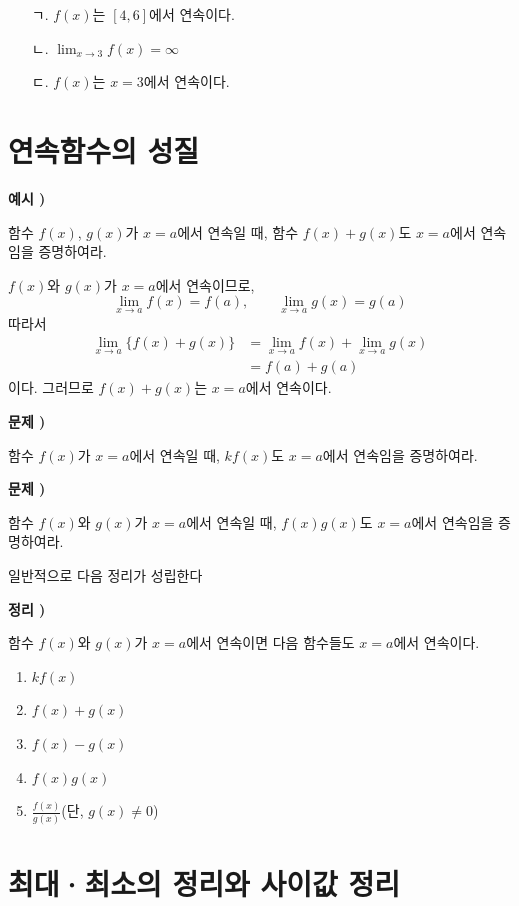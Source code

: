 \documentclass{oblivoir}
\newcounter{num}
\newcommand\theo[1]
{\bigskip\par\noindent\stepcounter{num} \textbf{정리 \thenum) #1}\par\noindent}
\newcommand\exam[1]
{\bigskip\par\noindent\stepcounter{num} \textbf{예시 \thenum) #1}\par\noindent}
\newcommand\prob[1]
{\bigskip\par\noindent\stepcounter{num} \textbf{문제 \thenum) #1}\par\noindent}
\newcommand\procedure[1]{\begin{mdframed}\vspace{#1\textheight}\end{mdframed}\bigskip}
\let\oldsection\section
\renewcommand\section{\clearpage\oldsection}
\begin{document}
\begin{enumerate}
\item[ㄱ.]
\(f(x)\)는 \([4,6]\)에서 연속이다.
\item[ㄴ.]
\(\displaystyle\lim_{x\to3}f(x)=\infty\)
\item[ㄷ.]
\(f(x)\)는 \(x=3\)에서 연속이다.
\end{enumerate}

\section{연속함수의 성질}

%
\exam{}
함수 \(f(x)\), \(g(x)\)가 \(x=a\)에서 연속일 때, 함수 \(f(x)+g(x)\)도 \(x=a\)에서 연속임을 증명하여라.
\begin{mdframed}
\(f(x)\)와 \(g(x)\)가 \(x=a\)에서 연속이므로,
\[\lim_{x\to a}f(x)=f(a),\qquad\lim_{x\to a}g(x)=g(a)\]
따라서
\begin{align*}
\lim_{x\to a}\{f(x)+g(x)\}
&=\lim_{x\to a}f(x)+\lim_{x\to a}g(x)\\
&=f(a)+g(a)
\end{align*}
이다.
그러므로 \(f(x)+g(x)\)는 \(x=a\)에서 연속이다.
\end{mdframed}
\bigskip

%
\prob{}
함수 \(f(x)\)가 \(x=a\)에서 연속일 때, \(kf(x)\)도 \(x=a\)에서 연속임을 증명하여라.
\procedure{0.3}

\clearpage
%
\prob{}
함수 \(f(x)\)와 \(g(x)\)가 \(x=a\)에서 연속일 때, \(f(x)g(x)\)도 \(x=a\)에서 연속임을 증명하여라.
\procedure{0.4}

일반적으로 다음 정리가 성립한다
\medskip

\begin{mdframed}
%
\theo{}
함수 \(f(x)\)와 \(g(x)\)가  \(x=a\)에서 연속이면 다음 함수들도 \(x=a\)에서 연속이다.
\begin{enumerate}[label=(\alph*)]
\item
\(kf(x)\)
\item
\(f(x)+g(x)\)
\item
\(f(x)-g(x)\)
\item
\(f(x)g(x)\)
\item
\(\displaystyle\frac{f(x)}{g(x)}\)\quad(단, \(g(x)\neq0\))
\end{enumerate}
\end{mdframed}
\bigskip

\section{최대·최소의 정리와 사이값 정리}
\end{document}
